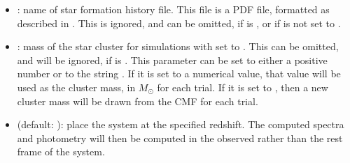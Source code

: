 \documentclass[letterpaper,10pt,english]{sphinxmanual}
\begin{document}
\begin{itemize}
\item {} 
: name of star formation history file. This file is a PDF file, formatted as described in {\hyperref[pdfs:sec-pdfs]{\emph{}}}. This is ignored, and can be omitted, if  is , or if  is not set to .

\item {} 
: mass of the star cluster for simulations with  set to . This can be omitted, and will be ignored, if  is . This parameter can be set to either a positive number or to the string . If it is set to a numerical value, that value will be used as the cluster mass, in \(M_\odot\) for each trial. If it is set to , then a new cluster mass will be drawn from the CMF for each trial.

\item {} 
 (default: ): place the system at the specified redshift. The computed spectra and photometry will then be computed in the observed rather than the rest frame of the system.

\end{itemize}
\end{document}
